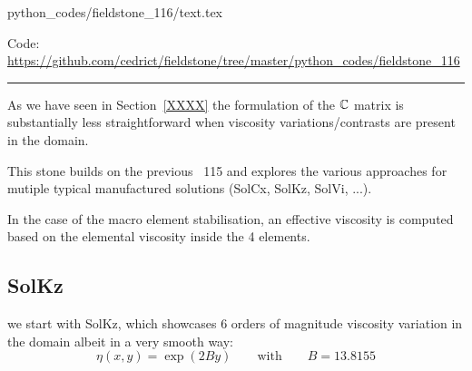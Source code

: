 \begin{flushright} {\tiny {\color{gray} python\_codes/fieldstone\_116/text.tex}} \end{flushright}



\begin{center}
\inpython
{\small Code: \url{https://github.com/cedrict/fieldstone/tree/master/python_codes/fieldstone_116}}
\end{center}

\par\noindent\rule{\textwidth}{0.4pt}


As we have seen in Section~\ref{XXXX} the formulation of the ${\mathbb{C}}$ matrix is substantially 
less straightforward when viscosity variations/contrasts are present in the domain. 

This stone builds on the previous \stone~115 and explores the various approaches for 
mutiple typical manufactured solutions (SolCx, SolKz, SolVi, ...).





In the case of the macro element stabilisation, an effective viscosity is computed based on the 
elemental viscosity inside the 4 elements. 


\subsection*{SolKz}

we start with SolKz, which showcases 6 orders of magnitude viscosity variation in the 
domain albeit in a very smooth way:
\[
\eta(x,y)=\exp (2 B y) \qquad \text{with} \qquad B=13.8155
\]





